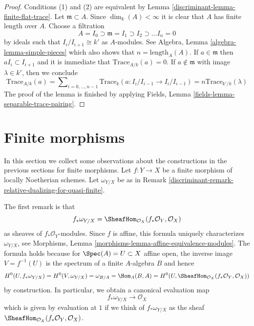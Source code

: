 \begin{proof}

Conditions (1) and (2) are equivalent by Lemma \ref{discriminant-lemma-finite-flat-trace}.
Let $\mathfrak m \subset A$. Since $\dim_k(A) < \infty$ it is clear that
$A$ has finite length over $A$. Choose a filtration
$$
A = I_0 \supset \mathfrak m = I_1 \supset I_2 \supset \ldots I_n = 0
$$
by ideals such that $I_i/I_{i + 1} \cong k'$ as $A$-modules. See
Algebra, Lemma \ref{algebra-lemma-simple-pieces} which also shows that
$n = \text{length}_A(A)$. If $a \in \mathfrak m$ then $aI_i \subset I_{i + 1}$
and it is immediate that $\text{Trace}_{A/k}(a) = 0$.
If $a \not \in \mathfrak m$ with image $\lambda \in k'$, then
we conclude
$$
\text{Trace}_{A/k}(a) =
\sum\nolimits_{i = 0, \ldots, n - 1}
\text{Trace}_k(a : I_i/I_{i - 1} \to I_i/I_{i - 1}) =
n \text{Trace}_{k'/k}(\lambda)
$$
The proof of the lemma is finished by applying
Fields, Lemma \ref{fields-lemma-separable-trace-pairing}.
\end{proof}

\section{Finite morphisms}
\label{discriminant-section-finite-morphisms}
In this section we collect some observations about the
constructions in the previous sections for finite morphisms.
Let $f : Y \to X$ be a finite morphism of locally Noetherian schemes.
Let $\omega_{Y/X}$ be as in
Remark \ref{discriminant-remark-relative-dualizing-for-quasi-finite}.

\medskip\noindent
The first remark is that
$$
f_*\omega_{Y/X} = \SheafHom_{\mathcal{O}_X}(f_*\mathcal{O}_Y, \mathcal{O}_X)
$$
as sheaves of $f_*\mathcal{O}_Y$-modules. Since $f$ is affine, this
formula uniquely characterizes $\omega_{Y/X}$, see
Morphisms, Lemma \ref{morphisms-lemma-affine-equivalence-modules}.
The formula holds because for $\Spec(A) = U \subset X$ affine open, the
inverse image $V = f^{-1}(U)$ is the spectrum of a finite $A$-algebra
$B$ and hence
$$
H^0(U, f_*\omega_{Y/X}) =
H^0(V, \omega_{Y/X}) =
\omega_{B/A} =
\Hom_A(B, A) =
H^0(U, \SheafHom_{\mathcal{O}_X}(f_*\mathcal{O}_Y, \mathcal{O}_X))
$$
by construction. In particular, we obtain a canonical evaluation map
$$
f_*\omega_{Y/X} \longrightarrow \mathcal{O}_X
$$
which is given by evaluation at $1$ if we think of $f_*\omega_{Y/X}$
as the sheaf $\SheafHom_{\mathcal{O}_X}(f_*\mathcal{O}_Y, \mathcal{O}_X)$.

